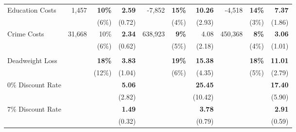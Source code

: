 \begin{tabular}{l r r r r r r r r r}
Education Costs	&	1,457	&	\textbf{10\%}	&	\textbf{2.59}	&	-7,852	&	\textbf{15\%}	&	\textbf{10.26}	&	-4,518	&	\textbf{14\%}	&	\textbf{7.37}	\\
	&		&	(6\%)	&	(0.72)	&		&	(4\%)	&	(2.93)	&		&	(3\%)	&	(1.86)	\\
Crime Costs	&	31,668	&	10\%	&	\textbf{2.34}	&	638,923	&	\textbf{9\%}	&	4.08	&	450,368	&	\textbf{8\%}	&	\textbf{3.06}	\\
	&		&	(6\%)	&	(0.62)	&		&	(5\%)	&	(2.18)	&	&	(4\%)	&	(1.01)	\\ \\
Deadweight Loss	&		&	\textbf{18\%}	&	\textbf{3.83}	&		&	\textbf{19\%}	&	\textbf{15.38}	&		&	\textbf{18\%}	&	\textbf{11.01}	\\
	&		&	(12\%)	&	(1.04)	&		&	(6\%)	&	(4.35)	&		&	(5\%)	&	(2.79)	\\
0\% Discount Rate	&		&		&	\textbf{5.06}	&		&		&	\textbf{25.45}	&		&		&	\textbf{17.40}	\\
	&		&		&	(2.82)	&		&		&	(10.42)	&		&		&	(5.90)	\\
7\% Discount Rate	&		&		&	\textbf{1.49}	&		&		&	\textbf{3.78}	&		&		&	\textbf{2.91}	\\
	&		&		&	(0.32)	&		&		&	(0.79)	&		&		&	(0.59)	\\
\bottomrule																			
\end{tabular}																			
